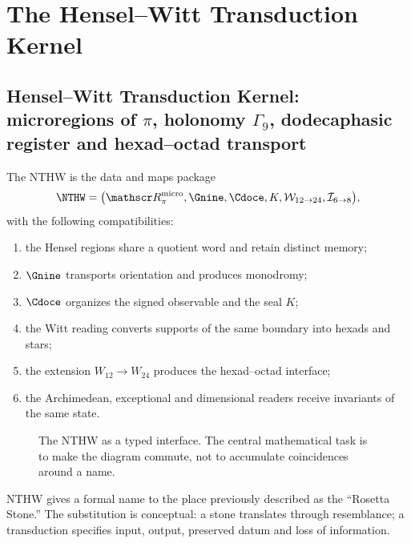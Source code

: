\label{chap:83-12}

\section{The Hensel--Witt Transduction Kernel}
\label{p12-83-c12-s1:chap:nthw}


\subsection{Hensel–Witt Transduction Kernel: microregions of \(\pi\), holonomy \(\Gamma_9\), dodecaphasic register and hexad–octad transport}

The NTHW is the data and maps package
\[
\NTHW=
\bigl(
\mathscr R_\pi^{\rm micro},
\Gnine,
\Cdoce,
K,
\mathcal W_{12\to24},
\mathcal I_{6\to8}
\bigr),
\]
with the following compatibilities:
\begin{enumerate}
  \item the Hensel regions share a quotient word and retain
  distinct memory;
  \item \(\Gnine\) transports orientation and produces monodromy;
  \item \(\Cdoce\) organizes the signed observable and the seal \(K\);
  \item the Witt reading converts supports of the same boundary into hexads and
  stars;
  \item the extension \(W_{12}\to W_{24}\) produces the
  hexad--octad interface;
  \item the Archimedean, exceptional and dimensional readers receive
  invariants of the same state.
\end{enumerate}

\begin{figure}[p]
\centering
\resizebox{\textwidth}{!}{}
\caption{The NTHW as a typed interface. The central mathematical task is to make
the diagram commute, not to accumulate coincidences around a name.}
\label{p12-83-c12-s1:fig:nthw}
\end{figure}

NTHW gives a formal name to the place previously described as the “Rosetta
Stone.” The substitution is conceptual: a stone translates through resemblance; a
transduction specifies input, output, preserved datum and loss of
information.

